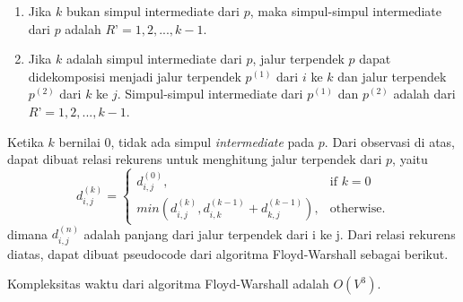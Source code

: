         \begin{enumerate}
            \item Jika $k$ bukan simpul intermediate dari $p$, maka simpul-simpul intermediate dari $p$ adalah $R’ = {1, 2, ..., k-1}$.
            \item Jika $k$ adalah simpul intermediate dari $p$, jalur terpendek $p$ dapat didekomposisi menjadi jalur terpendek $p^{(1)}$ dari $i$ ke $k$ 
            dan jalur terpendek $p^{(2)}$ dari $k$ ke $j$. Simpul-simpul intermediate dari $p^{(1)}$ dan $p^{(2)}$ adalah dari $R’ = {1, 2, ..., k-1}$.
        \end{enumerate}

        Ketika $k$ bernilai 0, tidak ada simpul \textit{intermediate} pada $p$. Dari observasi di atas, dapat dibuat relasi rekurens untuk menghitung jalur terpendek dari $p$, yaitu
        \begin{equation}
            d_{i,j}^{(k)} =
            \begin{cases}
                d_{i,j}^{(0)}, & \text{if } k = 0\\
                min(d_{i,j}^{(k)}, d_{i,k}^{(k-1)} + d_{k,j}^{(k-1)}), & \text{otherwise}.
            \end{cases}
        \end{equation}
        dimana $d_{i,j}^{(n)}$ adalah panjang dari jalur terpendek dari i ke j. Dari relasi rekurens diatas, dapat dibuat pseudocode dari algoritma Floyd-Warshall sebagai berikut.

        \medskip
        

        Kompleksitas waktu dari algoritma Floyd-Warshall adalah $O(V^{3})$.
